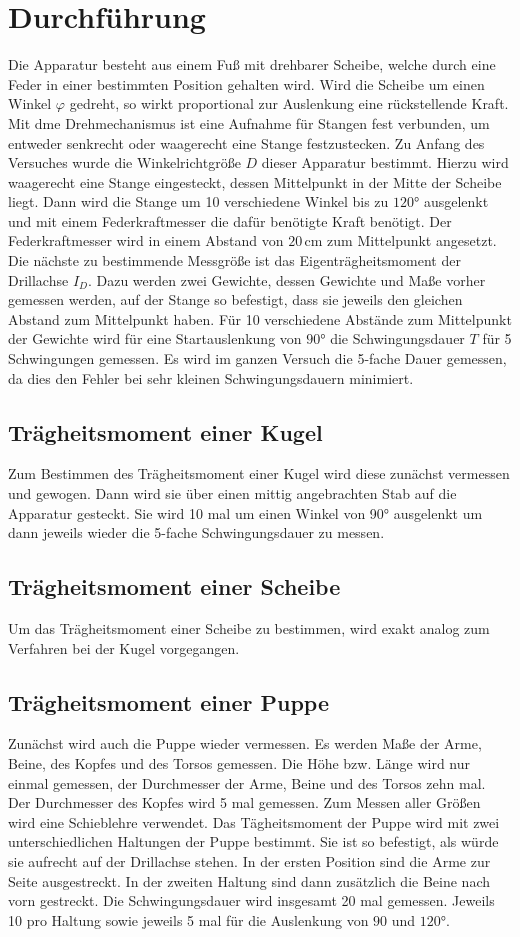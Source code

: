 \section{Durchführung}
\label{sec:Durchführung}
Die Apparatur besteht aus einem Fuß mit drehbarer Scheibe, welche durch eine Feder in einer bestimmten 
Position gehalten wird. Wird die Scheibe um einen Winkel $\varphi$ gedreht, so wirkt proportional zur Auslenkung 
eine rückstellende Kraft. Mit dme Drehmechanismus ist eine Aufnahme für Stangen fest verbunden, um entweder 
senkrecht oder waagerecht eine Stange festzustecken.  
Zu Anfang des Versuches wurde die Winkelrichtgröße $D$ dieser Apparatur bestimmt. Hierzu wird waagerecht eine Stange 
eingesteckt, dessen Mittelpunkt in der Mitte der Scheibe liegt. Dann wird die Stange um 10 verschiedene Winkel bis zu 
$120°$ ausgelenkt und mit einem Federkraftmesser die dafür benötigte Kraft benötigt. Der Federkraftmesser wird 
in einem Abstand von $20$\,cm zum Mittelpunkt angesetzt. Die nächste zu bestimmende Messgröße ist das 
Eigenträgheitsmoment der Drillachse $I_D$. Dazu werden zwei Gewichte, dessen Gewichte und Maße vorher gemessen werden,
auf der Stange so befestigt, dass sie jeweils den gleichen Abstand zum Mittelpunkt haben.
Für 10 verschiedene Abstände zum Mittelpunkt der Gewichte wird für eine Startauslenkung 
von $90°$ die Schwingungsdauer $T$ für 5 Schwingungen gemessen. Es wird im ganzen Versuch die 5-fache Dauer gemessen, 
da dies den Fehler bei sehr kleinen Schwingungsdauern minimiert.
\subsection{Trägheitsmoment einer Kugel}
Zum Bestimmen des Trägheitsmoment einer Kugel wird diese zunächst vermessen und gewogen. Dann wird sie über einen mittig
angebrachten Stab auf die Apparatur gesteckt. Sie wird 10 mal um einen Winkel von 90° ausgelenkt um dann jeweils wieder 
die 5-fache Schwingungsdauer zu messen. 
\subsection{Trägheitsmoment einer Scheibe}
Um das Trägheitsmoment einer Scheibe zu bestimmen, wird exakt analog zum Verfahren bei der Kugel vorgegangen.
\subsection{Trägheitsmoment einer Puppe}
Zunächst wird auch die Puppe wieder vermessen. Es werden Maße der Arme, Beine, des Kopfes und des Torsos gemessen. Die 
Höhe bzw. Länge wird nur einmal gemessen, der Durchmesser der Arme, Beine und des Torsos zehn mal. Der Durchmesser des 
Kopfes wird 5 mal gemessen. Zum Messen aller Größen wird eine Schieblehre verwendet. Das Tägheitsmoment der Puppe wird 
mit zwei unterschiedlichen Haltungen der Puppe bestimmt. Sie ist so befestigt, als würde sie aufrecht auf der Drillachse 
stehen. In der ersten Position sind die Arme zur Seite ausgestreckt. In der zweiten Haltung sind dann zusätzlich die 
Beine nach vorn gestreckt. Die Schwingungsdauer wird insgesamt 20 mal gemessen. Jeweils 10 pro Haltung sowie jeweils 
5 mal für die Auslenkung von $90$ und $120°$.